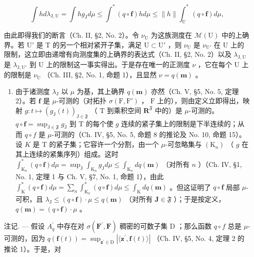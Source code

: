 \[
\int h d \lambda_ {\mathrm{J}, \mathrm{U}} = \int h g _ {\mathrm{J}} d \mu \leqslant \int^ {*} (q \circ \mathbf {f}) h d \mu \leqslant \| h \| \int_ {\mathrm{U}} ^ {*} (q \circ \mathbf {f}) d \mu ,
\]

由此即得我们的断言（Ch. II, §2, No. 2）。令 \(\nu_{\mathrm{U}}\) 为这族测度在 \(\mathcal{M}(\mathrm{U})\) 中的上确界。若 \(\mathrm{U}'\) 是 T 的另一个相对紧开子集，满足 \(\mathrm{U} \subset \mathrm{U}'\) ，则 \(\nu_{\mathrm{U}}\) 是 \(\nu_{\mathrm{U}'}\) 在 U 上的限制，这立即由递增有向测度集的上确界的表达式（Ch. II, §2, No. 2）以及 \(\lambda_{\mathrm{J,U}}\) 是 \(\lambda_{\mathrm{J,U}'}\) 到 U 上的限制这一事实得出。于是存在唯一的正测度 \(\nu\) ，它在每个 U 上的限制是 \(\nu_{\mathrm{U}}\) （Ch. III, §2, No. 1, 命题 1），且显然 \(\nu = q(\mathbf{m})\) 。

\begin{enumerate}
\def\labelenumi{\alph{enumi})}
\setcounter{enumi}{1}
\tightlist
\item
  由于诸测度 \(\lambda_{\mathrm{J}}\) 以 \(\mu\) 为基，其上确界 \(q(\mathbf{m})\) 亦然（Ch. V, §5, No. 5, 定理 2）。若 \(\mathbf{f}\) 是 \(\mu\)-可测的（对拓扑 \(\sigma(\mathrm{F},\mathrm{F}')\) ， \(\mathrm{F}\) 上的），则由定义立即得出，映射 \(g:t\mapsto(g_{\mathrm{J}}(t))_{\mathrm{J}\in\mathfrak{F}}\) （ \(\mathrm{T}\) 到乘积空间 \(\mathbf{R}^{\mathfrak{F}}\) 中的）是 \(\mu\)-可测的。 \(q\circ\mathbf{f}=\sup_{\mathrm{J}\in\mathfrak{F}}g_{\mathrm{J}}\) 到 \(\mathrm{T}\) 的每个使 \(g\) 连续的紧子集上的限制是下半连续的；从而 \(q \circ f\) 是 \(\mu\)-可测的（Ch. IV, §5, No. 5, 命题 8 的推论及 No. 10, 命题 15）。设 \(K\) 是 T 的紧子集；它容许一个分割，由一个 \(\mu\)-可忽略集与 \((\mathrm{K}_n)\) （ \(g\) 在其上连续的紧集序列）组成。这时 \(\int_{\mathrm{K}_n}^*\left(q\circ \mathbf{f}\right)d\mu = \sup_{\mathrm{J}}\int_{\mathrm{K}_n}g_{\mathrm{J}}d\mu \leqslant \int_{\mathrm{K}_n}dq(\mathbf{m})\) （对所有 \(n\) ）（Ch. IV, §1, No. 1, 定理 1 与 Ch. V, §7, No. 1, 命题 1），由此 \(\int_{\mathrm{K}}^{*}(q\circ \mathbf{f})d\mu = \sum_{n}\int_{\mathrm{K}_n}^*\left(q\circ \mathbf{f}\right)d\mu \leqslant \int_{\mathrm{K}}dq(\mathbf{m})\) 。但这证明了 \(q\circ \mathbf{f}\) 局部 \(\mu\)-可积，且 \(\lambda_{\mathrm{J}}\leqslant (q\circ \mathbf{f})\cdot \mu \leqslant q(\mathbf{m})\) （对所有 \(\mathbf{J}\in \mathfrak{F}\) ）；于是按定义， \(q(\mathbf{m}) = (q\circ \mathbf{f})\cdot \mu\) 。
\end{enumerate}

注记. --- 假设 \(A_{q}^{\prime}\) 中存在对 \(\sigma(\mathbf{F}^{\prime},\mathbf{F})\) 稠密的可数子集 D ；那么函数 \(q\circ f\) 总是 \(\mu\)-可测的，因为 \(q(\mathbf{f}(t)) = \sup_{\mathbf{z}^{\prime}\in\mathrm{D}} |\langle\mathbf{z}^{\prime},\mathbf{f}(t)\rangle|\) （Ch. IV, §5, No. 4, 定理 2 的推论 1）。于是，对

